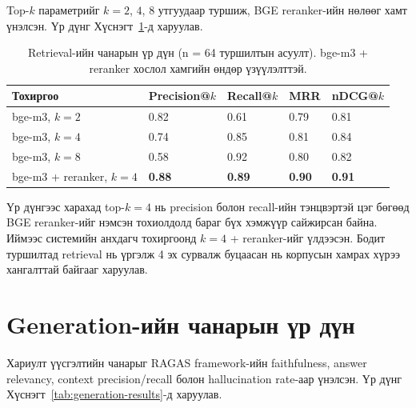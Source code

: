 Top-$k$ параметрийг $k=2$, $4$, $8$ утгуудаар туршиж, BGE reranker-ийн нөлөөг хамт үнэлсэн. Үр дүнг Хүснэгт~\ref{tab:retrieval-results}-д харуулав.

\begin{table}[H]
\centering
\begin{tabular}{|p{4.0cm}|p{2.3cm}|p{2.3cm}|p{2.0cm}|p{2.0cm}|}
\hline
\textbf{Тохиргоо} & \textbf{Precision@$k$} & \textbf{Recall@$k$} & \textbf{MRR} & \textbf{nDCG@$k$} \\ \hline
bge-m3, $k=2$ & 0.82 & 0.61 & 0.79 & 0.81 \\ \hline
bge-m3, $k=4$ & 0.74 & 0.85 & 0.81 & 0.84 \\ \hline
bge-m3, $k=8$ & 0.58 & 0.92 & 0.80 & 0.82 \\ \hline
bge-m3 + reranker, $k=4$ & \textbf{0.88} & \textbf{0.89} & \textbf{0.90} & \textbf{0.91} \\ \hline
\end{tabular}
\caption[Retrieval-ийн чанарын үр дүн]{Retrieval-ийн чанарын үр дүн (n = 64 туршилтын асуулт). bge-m3 + reranker хослол хамгийн өндөр үзүүлэлттэй.}
\label{tab:retrieval-results}
\end{table}


Үр дүнгээс харахад top-$k=4$ нь precision болон recall-ийн тэнцвэртэй цэг бөгөөд BGE reranker-ийг нэмсэн тохиолдолд бараг бүх хэмжүүр сайжирсан байна. Иймээс системийн анхдагч тохиргоонд $k=4$ + reranker-ийг үлдээсэн. Бодит туршилтад retrieval нь үргэлж 4 эх сурвалж буцаасан нь корпусын хамрах хүрээ хангалттай байгааг харуулав.


\section{Generation-ийн чанарын үр дүн}

Хариулт үүсгэлтийн чанарыг RAGAS framework-ийн faithfulness, answer relevancy, context precision/recall болон hallucination rate-аар үнэлсэн. Үр дүнг Хүснэгт~\ref{tab:generation-results}-д харуулав.

